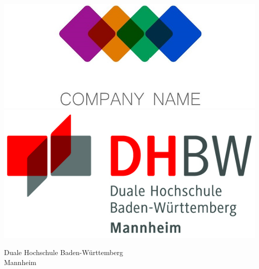 \begin{titlepage}
	\begin{minipage}{\textwidth}
		\vspace{-2cm}
		\noindent \includegraphics[scale=0.71]{resource/Firmenlogo.jpg} \hfill   \includegraphics{resource/DHBW-Logo.jpg}
	\end{minipage}
	\vspace{1em}
	\sffamily
	\begin{center}
		\textsf{\large{}Duale Hochschule Baden-W\"urttemberg\\[1.5mm] Mannheim}\\[2em]
		\textsf{\textbf{\Large{}\varKindOfDocument}}\\[3mm]
		\textsf{\textbf{\varTitle}} \\[1.5cm]
		\textsf{\textbf{\Large{}\varCourseName}\\[3mm] \textsf{\varFieldOfStudy}}
		
		\vspace{3em}
		\vfill
		
		\begin{minipage}{\textwidth}
			

\end{minipage}
\end{center}
\end{titlepage}
